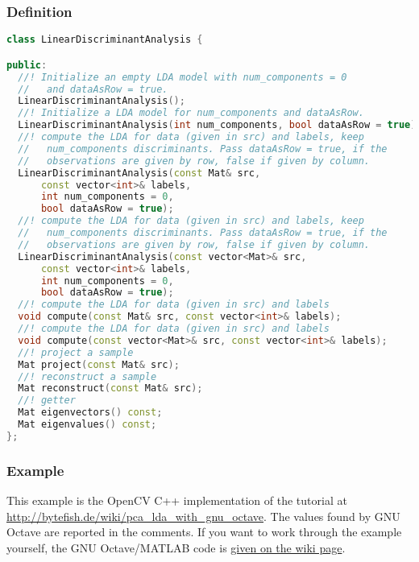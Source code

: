 \subsubsection{Definition}
\begin{lstlisting}[language=c++]
class LinearDiscriminantAnalysis {

public:
  //! Initialize an empty LDA model with num_components = 0
  //   and dataAsRow = true.
  LinearDiscriminantAnalysis();
  //! Initialize a LDA model for num_components and dataAsRow.
  LinearDiscriminantAnalysis(int num_components, bool dataAsRow = true);
  //! compute the LDA for data (given in src) and labels, keep 
  //   num_components discriminants. Pass dataAsRow = true, if the 
  //   observations are given by row, false if given by column.
  LinearDiscriminantAnalysis(const Mat& src,
      const vector<int>& labels,
      int num_components = 0,
      bool dataAsRow = true);
  //! compute the LDA for data (given in src) and labels, keep 
  //   num_components discriminants. Pass dataAsRow = true, if the 
  //   observations are given by row, false if given by column.
  LinearDiscriminantAnalysis(const vector<Mat>& src,
      const vector<int>& labels,
      int num_components = 0,
      bool dataAsRow = true);
  //! compute the LDA for data (given in src) and labels 
  void compute(const Mat& src, const vector<int>& labels);
  //! compute the LDA for data (given in src) and labels 
  void compute(const vector<Mat>& src, const vector<int>& labels);
  //! project a sample
  Mat project(const Mat& src);
  //! reconstruct a sample
  Mat reconstruct(const Mat& src);
  //! getter
  Mat eigenvectors() const;
  Mat eigenvalues() const;
};
\end{lstlisting}

\subsubsection{Example}
This example is the OpenCV C++ implementation of the tutorial at \url{http://bytefish.de/wiki/pca_lda_with_gnu_octave}. The values found by GNU Octave are reported in the comments. If you want to work through the example yourself, the GNU Octave/MATLAB code is \href{http://bytefish.de/wiki/pca_lda_with_gnu_octave}{given on the wiki page}.


